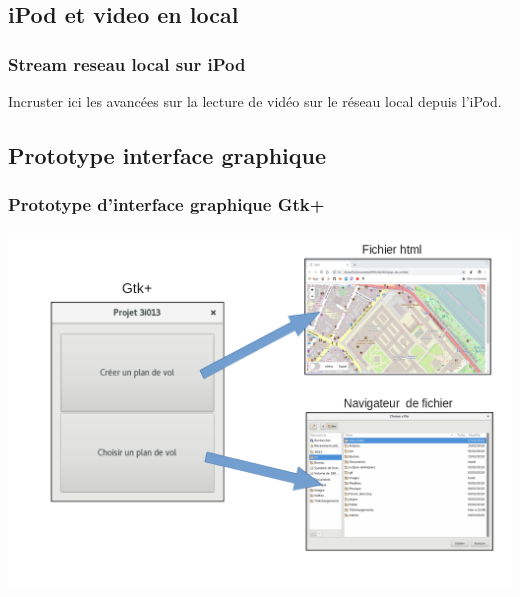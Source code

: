 \documentclass{beamer}
\begin{document}
	\begin{frame}
	\section{iPod et video en local}
		\begin{center}
		\frametitle{Stream reseau local sur iPod}
		Incruster ici les avancées sur la lecture de vidéo sur le réseau local depuis l'iPod.
		\end{center}	
	\end{frame}
	
	\begin{frame}
	\section{Prototype interface graphique}
		\begin{center}
		\frametitle{Prototype d'interface graphique Gtk+}		
		\includegraphics[scale=0.35]{schema_GUI.png}
		\end{center}
	\end{frame}
	
\end{document}
